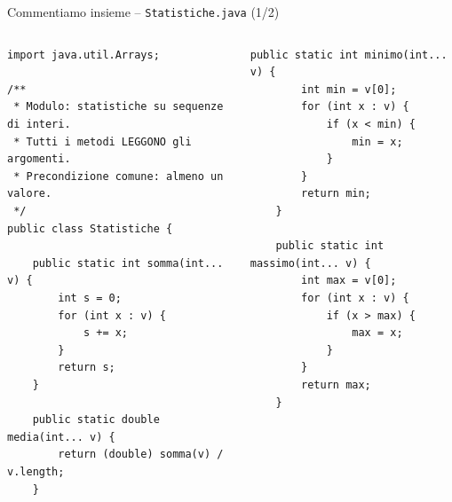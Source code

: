 \documentclass[10pt,aspectratio=169]{beamer}
\begin{document}
\begin{frame}[fragile]{Commentiamo insieme -- \texttt{Statistiche.java} (1/2)}
\begin{columns}[T]
\begin{lstlisting}[basicstyle=\ttfamily\scriptsize]
import java.util.Arrays;

/**
 * Modulo: statistiche su sequenze di interi.
 * Tutti i metodi LEGGONO gli argomenti.
 * Precondizione comune: almeno un valore.
 */
public class Statistiche {

    public static int somma(int... v) {
        int s = 0;
        for (int x : v) {
            s += x;
        }
        return s;
    }

    public static double media(int... v) {
        return (double) somma(v) / v.length;
    }
\end{lstlisting}

\begin{lstlisting}[basicstyle=\ttfamily\scriptsize]
    public static int minimo(int... v) {
        int min = v[0];
        for (int x : v) {
            if (x < min) {
                min = x;
            }
        }
        return min;
    }

    public static int massimo(int... v) {
        int max = v[0];
        for (int x : v) {
            if (x > max) {
                max = x;
            }
        }
        return max;
    }
\end{lstlisting}
\end{columns}
\end{frame}
\end{document}
